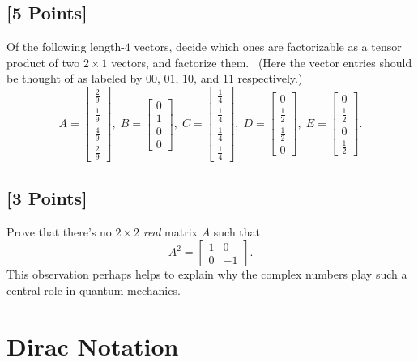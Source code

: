 \documentclass[11pt]{article}
\begin{document}
\subsection{[5 Points]} Of the following length-$4$ vectors, decide which ones are factorizable as a tensor product of two $2 \times 1$ vectors, and factorize them. \ (Here the vector entries
should be thought of as labeled by $00$, $01$, $10$, and $11$ respectively.)%
\[
A=
\begin{bmatrix}
	\frac{2}{9}\\[0.1em]
	\frac{1}{9}\\[0.1em]
	\frac{4}{9}\\[0.1em]
	\frac{2}{9}
\end{bmatrix}\!,\;
B=
\begin{bmatrix}
	0\\
	1\\
	0\\
	0
\end{bmatrix}\!,\;
C=
\begin{bmatrix}
	\frac{1}{4}\\[0.1em]
	\frac{1}{4}\\[0.1em]
	\frac{1}{4}\\[0.1em]
	\frac{1}{4}
\end{bmatrix}\!,\;
D=
\begin{bmatrix}
	0\\
	\frac{1}{2}\\[0.1em]
	\frac{1}{2}\\
	0
\end{bmatrix}\!,\;
E=
\begin{bmatrix}
	0\\
	\frac{1}{2}\\
	0\\
	\frac{1}{2}
\end{bmatrix}.
\]


\subsection{[3 Points]} Prove that there's no $2 \times 2$ \emph{real} matrix $A$ such
that
\[
A^2=
\begin{bmatrix}
	1 & 0\\
	0 & -1
\end{bmatrix}\!.
\]
This observation perhaps helps to explain why the complex numbers play such a
central role in quantum mechanics.


\section{Dirac Notation}
 
\end{document}
